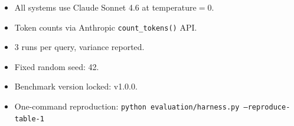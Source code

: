 \begin{itemize}
  \item All systems use Claude Sonnet 4.6 at temperature$=$0.
  \item Token counts via Anthropic \texttt{count\_tokens()} API.
  \item 3 runs per query, variance reported.
  \item Fixed random seed: 42.
  \item Benchmark version locked: v1.0.0.
  \item One-command reproduction: \texttt{python evaluation/harness.py --reproduce-table-1}
\end{itemize}
